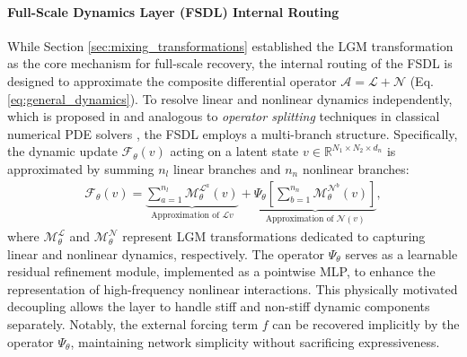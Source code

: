 \documentclass[final,3p,times]{elsarticle}
\begin{document}
\paragraph{Full-Scale Dynamics Layer (FSDL) Internal Routing}
While Section \ref{sec:mixing_transformations} established the LGM transformation as the core mechanism for full-scale recovery, the internal routing of the FSDL is designed to approximate the composite differential operator $\mathscr{A} = \mathscr{L} + \mathscr{N}$ (Eq. \eqref{eq:general_dynamics}). To resolve linear and nonlinear dynamics independently, which is proposed in \cite{lai2025dymixop} and analogous to \emph{operator splitting} techniques in classical numerical PDE solvers \cite{gottlieb1977numerical}, the FSDL employs a multi-branch structure. Specifically, the dynamic update $\mathscr{F}_\theta(v)$ acting on a latent state $v \in \mathbb{R}^{N_1 \times N_2 \times d_n}$ is approximated by summing $n_l$ linear branches and $n_n$ nonlinear branches:
\begin{align}
\mathscr{F}_\theta(v) = \underbrace{\sum_{a=1}^{n_l} \mathscr{M}^{\mathscr{L}^{a}}_\theta(v)}_{\text{Approximation of } \mathscr{L}v} + \underbrace{\Psi_\theta\left[\sum_{b=1}^{n_n} \mathscr{M}^{\mathscr{N}^{b}}_\theta(v)\right]}_{\text{Approximation of } \mathscr{N}(v)},
\label{eq:fsdl_definition}
\end{align}
where $\mathscr{M}^{\mathscr{L}}_\theta$ and $\mathscr{M}^{\mathscr{N}}_\theta$ represent LGM transformations dedicated to capturing linear and nonlinear dynamics, respectively. The operator $\Psi_\theta$ serves as a learnable residual refinement module, implemented as a pointwise MLP, to enhance the representation of high-frequency nonlinear interactions. This physically motivated decoupling allows the layer to handle stiff and non-stiff dynamic components separately. Notably, the external forcing term $f$ can be recovered implicitly by the operator $\Psi_\theta$, maintaining network simplicity without sacrificing expressiveness.
\end{document}
